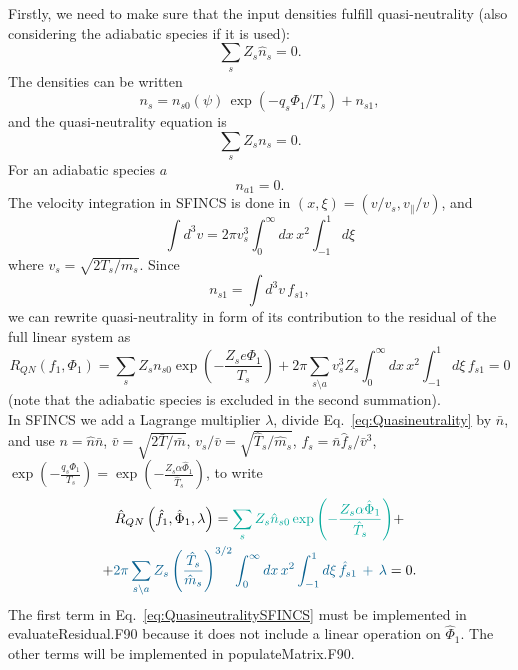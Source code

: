 \documentclass[12pt]{article}
\begin{document}
Firstly, we need to make sure that the input densities fulfill quasi-neutrality (also considering the adiabatic species if it is used):
\begin{equation}
  \label{eq:QuasiNeutralityInputFull}
  \sum_s Z_s \hat{n}_s = 0.
\end{equation}
%
The densities can be written
\begin{equation}
n_s = n_{s 0} \left(\psi\right) \, \exp \left(- q_s \Phi_1 / T_s \right) + n_{s 1},
\label{eq:DensityParts}
\end{equation}
and the quasi-neutrality equation is 
\begin{equation}
\sum_s Z_s n_s = 0.
\label{eq:Quasineutrality}
\end{equation}
For an adiabatic species $a$
\[
n_{a 1} = 0.
\]
The velocity integration in SFINCS is done in $\left(x, \xi\right) = \left(v / v_s, v_\| / v\right)$, and 
\begin{equation}
\int d^3 v = 2 \pi v_{s}^3 \int_{0}^{\infty} dx\, x^2 \int_{-1}^{1} d\xi
\label{eq:VelocityIntegration}
\end{equation}
where $v_{s} = \sqrt{2 T_s / m_s}$. 
Since 
\begin{equation}
  \label{eq:ns1Int}
  n_{s 1} = \int d^3 v \, f_{s 1},
\end{equation}
we can rewrite quasi-neutrality in form of its contribution to the residual of the full linear system as 
\begin{equation}
R_{QN}\left(f_{1}, \Phi_1\right) = \sum_s Z_s n_{s0} \exp\left(- \frac{Z_s e \Phi_1}{T_s}\right) + 2\pi \sum_{s \setminus a} v_s^3 Z_s \int_0^{\infty} dx \, x^2 \int_{-1}^1 d\xi \, f_{s 1} = 0
\label{eq:Quasineutrality}
\end{equation}
(note that the adiabatic species is excluded in the second summation).\\

\noindent In SFINCS we add a Lagrange multiplier $\lambda$, divide Eq.~\ref{eq:Quasineutrality} by $\bar{n}$, and use $n = \hat{n} \bar{n}$, $\bar{v} = \sqrt{2 \bar{T} / \bar{m}}$, $v_s / \bar{v} = \sqrt{\hat{T}_s / \hat{m}_s}$, $f_s = \bar{n} \hat{f}_s / \bar{v}^3$, $ \displaystyle
\exp \left(- \frac{q_s \Phi_1}{T_s}  \right) = \exp \left(- \frac{Z_s \alpha \hat{\Phi}_1}{\hat{T}_s}  \right) 
$, to write 
\begin{multline}
\hat{R}_{QN}\left(\hat{f}_{1}, \hat{\Phi}_1, \lambda\right) = \textcolor{JungleGreen}{
\sum_s Z_s \hat{n}_{s0} \exp \left(- \frac{Z_s \alpha \hat{\Phi}_1}{\hat{T}_s}  \right)} + \\ + 
\textcolor{MidnightBlue}{
2\pi \sum_{s \setminus a} Z_s \left(\frac{\hat{T}_s}{\hat{m}_s}\right)^{3/2} \int_0^{\infty} dx \, x^2 \int_{-1}^1 d\xi \, \hat{f}_{s 1} \, + \, \lambda } = 0.
\label{eq:QuasineutralitySFINCS}
\end{multline}
The first term in Eq.~\ref{eq:QuasineutralitySFINCS} must be implemented in evaluateResidual.F90 because it does not include a linear operation on $\hat{\Phi}_1$. 
The other terms will be implemented in populateMatrix.F90.\\
\end{document}
